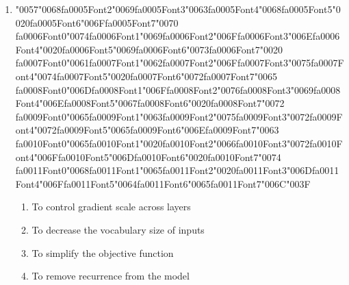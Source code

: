 \documentclass[12pt]{article}
\begin{document}
\begin{enumerate}[label=Q\arabic*.]
 \item {\char"0057}{\char"0068}{\csname fa0005Font2\endcsname\char"0069}{\csname fa0005Font3\endcsname\char"0063}{\csname fa0005Font4\endcsname\char"0068}{\csname fa0005Font5\endcsname\char"0020}{\csname fa0005Font6\endcsname\char"006F}{\csname fa0005Font7\endcsname\char"0070} {\csname fa0006Font0\endcsname\char"0074}{\csname fa0006Font1\endcsname\char"0069}{\csname fa0006Font2\endcsname\char"006F}{\csname fa0006Font3\endcsname\char"006E}{\csname fa0006Font4\endcsname\char"0020}{\csname fa0006Font5\endcsname\char"0069}{\csname fa0006Font6\endcsname\char"0073}{\csname fa0006Font7\endcsname\char"0020} {\csname fa0007Font0\endcsname\char"0061}{\csname fa0007Font1\endcsname\char"0062}{\csname fa0007Font2\endcsname\char"006F}{\csname fa0007Font3\endcsname\char"0075}{\csname fa0007Font4\endcsname\char"0074}{\csname fa0007Font5\endcsname\char"0020}{\csname fa0007Font6\endcsname\char"0072}{\csname fa0007Font7\endcsname\char"0065} {\csname fa0008Font0\endcsname\char"006D}{\csname fa0008Font1\endcsname\char"006F}{\csname fa0008Font2\endcsname\char"0076}{\csname fa0008Font3\endcsname\char"0069}{\csname fa0008Font4\endcsname\char"006E}{\csname fa0008Font5\endcsname\char"0067}{\csname fa0008Font6\endcsname\char"0020}{\csname fa0008Font7\endcsname\char"0072} {\csname fa0009Font0\endcsname\char"0065}{\csname fa0009Font1\endcsname\char"0063}{\csname fa0009Font2\endcsname\char"0075}{\csname fa0009Font3\endcsname\char"0072}{\csname fa0009Font4\endcsname\char"0072}{\csname fa0009Font5\endcsname\char"0065}{\csname fa0009Font6\endcsname\char"006E}{\csname fa0009Font7\endcsname\char"0063} {\csname fa0010Font0\endcsname\char"0065}{\csname fa0010Font1\endcsname\char"0020}{\csname fa0010Font2\endcsname\char"0066}{\csname fa0010Font3\endcsname\char"0072}{\csname fa0010Font4\endcsname\char"006F}{\csname fa0010Font5\endcsname\char"006D}{\csname fa0010Font6\endcsname\char"0020}{\csname fa0010Font7\endcsname\char"0074} {\csname fa0011Font0\endcsname\char"0068}{\csname fa0011Font1\endcsname\char"0065}{\csname fa0011Font2\endcsname\char"0020}{\csname fa0011Font3\endcsname\char"006D}{\csname fa0011Font4\endcsname\char"006F}{\csname fa0011Font5\endcsname\char"0064}{\csname fa0011Font6\endcsname\char"0065}{\csname fa0011Font7\endcsname\char"006C}{\char"003F}
 \begin{enumerate}[label=(\Alph*)]
     \item To control gradient scale across layers
     \item To decrease the vocabulary size of inputs
     \item To simplify the objective function
     \item To remove recurrence from the model
 \end{enumerate}
 

\end{enumerate}
\end{document}
